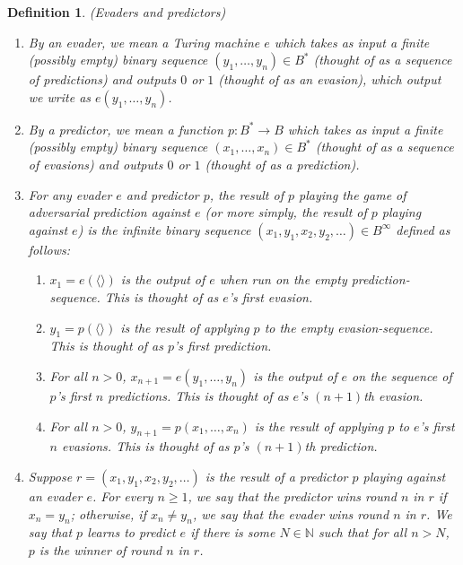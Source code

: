 \documentclass{article}
\newtheorem{definition}{Definition}
\begin{document}
\begin{definition}
\label{evaderpredictordefn}
    (Evaders and predictors)
    \begin{enumerate}
        \item
        By an \emph{evader}, we mean a Turing machine $e$
        which takes as input a finite (possibly empty) binary sequence
        $(y_1,\ldots,y_n)\in B^*$
        (thought of as a sequence of \emph{predictions})
        and outputs $0$ or $1$ (thought of as an \emph{evasion}), which output
        we write as $e(y_1,\ldots,y_n)$.
        \item
        By a \emph{predictor}, we mean a function $p:B^*\to B$
        which takes as input a finite (possibly empty) binary sequence
        $(x_1,\ldots,x_n)\in B^*$
        (thought of as a sequence of \emph{evasions})
        and outputs $0$ or $1$ (thought of as a \emph{prediction}).
        \item
        For any evader $e$ and predictor $p$, the \emph{result of $p$ playing the
        game of adversarial prediction against $e$} (or more simply, the \emph{result of
        $p$ playing against $e$}) is the infinite binary sequence
        $(x_1,y_1,x_2,y_2,\ldots)\in B^\infty$
        defined as follows:
        \begin{enumerate}
            \item
            $x_1=e(\langle\rangle)$ is
            the output of $e$ when run on the empty prediction-sequence.
            This is thought of as $e$'s first evasion.
            \item
            $y_1=p(\langle\rangle)$ is
            the result of applying $p$ to the empty evasion-sequence.
            This is thought of as $p$'s first prediction.
            \item
            For all $n>0$,
            $x_{n+1}=e(y_1,\ldots,y_n)$ is
            the output of $e$ on the sequence of $p$'s first $n$ predictions.
            This is thought of as $e$'s $(n+1)$th evasion.
            \item
            For all $n>0$,
            $y_{n+1}=p(x_1,\ldots,x_n)$ is
            the result of applying $p$ to $e$'s first $n$ evasions.
            This is thought of as $p$'s $(n+1)$th prediction.
        \end{enumerate}
        \item
        Suppose $r=(x_1,y_1,x_2,y_2,\ldots)$ is the result of a predictor $p$ playing
        against an evader $e$. For every $n\geq 1$,
        we say that \emph{the predictor wins round $n$ in $r$}
        if $x_n=y_n$; otherwise, if $x_n\neq y_n$, we say that
        \emph{the evader wins round $n$ in $r$}.
        We say that \emph{$p$ learns to predict $e$} if there is some $N\in\mathbb N$
        such that for all $n>N$, $p$ is the winner of round $n$ in $r$.
    \end{enumerate}
\end{definition}
\end{document}
